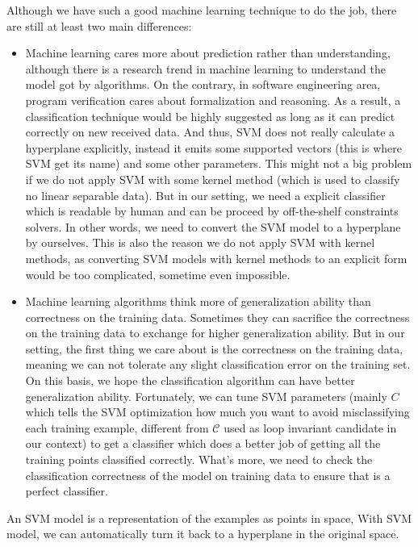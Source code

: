 Although we have such a good machine learning technique to do the job,
there are still at least two main differences:
\begin{itemize}
\item Machine learning cares more about prediction rather than understanding,
although there is a research trend in machine learning to understand the model got by algorithms.
On the contrary, in software engineering area, program verification cares about formalization and reasoning.
As a result, a classification technique would be highly suggested as long as it can predict correctly on new received data.
And thus, SVM does not really calculate a hyperplane explicitly, 
instead it emits some supported vectors (this is where SVM get its name) and some other parameters.
This might not a big problem if we do not apply SVM with some kernel method (which is used to classify no linear separable data).
But in our setting, we need a explicit classifier which is readable by human and can be proceed by off-the-shelf constraints solvers.
In other words, we need to convert the SVM model to a hyperplane by ourselves.
This is also the reason we do not apply SVM with kernel methods,
as converting SVM models with kernel methods to an explicit form would be too complicated, sometime even impossible.
\item Machine learning algorithms think more of generalization ability than correctness on the training data.
Sometimes they can sacrifice the correctness on the training data to exchange for higher generalization ability.
But in our setting, the first thing we care about is the correctness on the training data,
meaning we can not tolerate any slight classification error on the training set.
On this basis, we hope the classification algorithm can have better generalization ability.
Fortunately, we can tune SVM parameters (mainly $C$ which tells the SVM optimization how much you want to avoid misclassifying each training example,
different from $\mathcal{C}$ used as loop invariant candidate in our context) 
to get a classifier which does a better job of getting all the training points classified correctly.
What's more, we need to check the classification correctness of the model on training data to ensure that is a perfect classifier. 

\end{itemize} 
An SVM model is a representation of the examples as points in space, 
With SVM model, we can automatically turn it back to a hyperplane in the original space.


